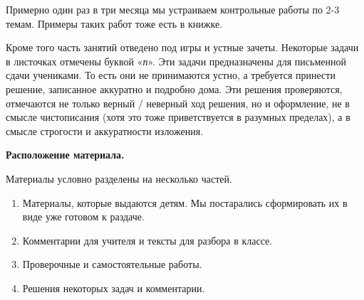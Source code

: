 Примерно один раз в три месяца мы устраиваем контрольные работы по 2-3 темам. Примеры таких работ тоже есть в книжке.  

Кроме того часть занятий отведено под игры и устные зачеты. Некоторые задачи в листочках отмечены буквой «\textit{п}». Эти задачи предназначены для письменной сдачи учениками. То есть они не принимаются устно, а требуется принести решение, записанное аккуратно и подробно дома. Эти решения проверяются, отмечаются не только верный / неверный ход решения, но и оформление, не в смысле чистописания (хотя это тоже приветствуется в разумных пределах), а в смысле строгости и аккуратности изложения.

\begin{center}
	\textbf{Расположение материала.}
\end{center}
Материалы условно разделены на несколько частей.
\begin{enumerate}
	\item Материалы, которые выдаются детям. Мы постарались сформировать их в виде уже готовом к раздаче.
	\item Комментарии для учителя и тексты для разбора в классе.
	\item Проверочные и самостоятельные работы.
	\item Решения некоторых задач и комментарии.
\end{enumerate}